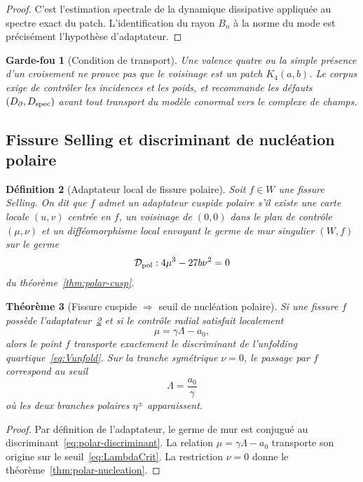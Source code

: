 \documentclass[11pt,a4paper]{article}
\newtheorem{theorem}{Théorème}[section]
\newtheorem{definition}[theorem]{Définition}
\newtheorem{guardrail}[theorem]{Garde-fou}
\begin{document}
\begin{proof}
C'est l'estimation spectrale de la dynamique dissipative appliquée au spectre exact du patch. L'identification du rayon $B_n$ à la norme du mode est précisément l'hypothèse d'adaptateur.
\end{proof}

\begin{guardrail}[Condition de transport]
Une valence quatre ou la simple présence d'un croisement ne prouve pas que le voisinage est un patch $K_4(a,b)$. Le corpus exige de contrôler les incidences et les poids, et recommande les défauts $(D_\partial,D_{\rm spec})$ avant tout transport du modèle conormal vers le complexe de champs.
\end{guardrail}

\subsection{Fissure Selling et discriminant de nucléation polaire}

\begin{definition}[Adaptateur local de fissure polaire]\label{def:fissure-adapter}
Soit $f\in W$ une fissure Selling. On dit que $f$ admet un \emph{adaptateur cuspide polaire} s'il existe une carte locale $(u,v)$ centrée en $f$, un voisinage de $(0,0)$ dans le plan de contrôle $(\mu,\nu)$ et un difféomorphisme local envoyant le germe de mur singulier $(W,f)$ sur le germe
\[
 \mathcal D_{\rm pol}:4\mu^3-27b\nu^2=0
\]
du théorème~\ref{thm:polar-cusp}.
\end{definition}

\begin{theorem}[Fissure cuspide $\Rightarrow$ seuil de nucléation polaire]\label{thm:fissure-polar}
Si une fissure $f$ possède l'adaptateur~\ref{def:fissure-adapter} et si le contrôle radial satisfait localement
\[
 \mu=\gamma\Lambda-a_0,
\]
alors le point $f$ transporte exactement le discriminant de l'unfolding quartique~\eqref{eq:Vunfold}. Sur la tranche symétrique $\nu=0$, le passage par $f$ correspond au seuil
\[
 \Lambda=\frac{a_0}{\gamma}
\]
où les deux branches polaires $\eta^\pm$ apparaissent.
\end{theorem}

\begin{proof}
Par définition de l'adaptateur, le germe de mur est conjugué au discriminant~\eqref{eq:polar-discriminant}. La relation $\mu=\gamma\Lambda-a_0$ transporte son origine sur le seuil~\eqref{eq:LambdaCrit}. La restriction $\nu=0$ donne le théorème~\ref{thm:polar-nucleation}.
\end{proof}
\end{document}
